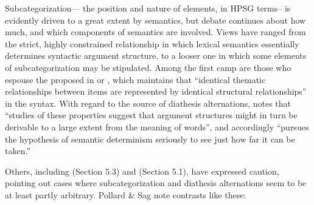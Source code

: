 \documentclass[output=paper
                ,modfonts
                ,nonflat
	        ,collection
	        ,collectionchapter
	        ,collectiontoclongg
 	        ,biblatex
                ,babelshorthands
                ,newtxmath
                ,draftmode
                ,colorlinks, citecolor=brown
]{./langsci/langscibook}
\begin{document}
Subcategorization--- the position and nature of \argst elements, in HPSG terms-- is evidently driven to a great extent by semantics,
but debate continues about how much, and which components of semantics are involved.
Views have ranged from the strict, highly constrained relationship in which lexical semantics essentially determines syntactic argument structure, to a looser one in which some elements of subcategorization may be stipulated.
Among  the first camp are those who espouse the   proposed in \citet[46]{Baker1988} or \citet{Baker1997}, which maintains that ``identical thematic relationships between items are represented by identical structural relationships'' in the syntax.
With regard to the source of  diathesis alternations, \citet[12-13]{Levin1993} notes that ``studies of these properties suggest that argument structures might in turn be derivable to a large extent from the meaning of words'', and accordingly ``pursues the hypothesis of semantic determinism seriously to see just how far it can be taken.''

Others, including \citet{pollard+sag:1987} (Section 5.3) and \citet{Davis2001} (Section 5.1), have expressed caution, pointing out cases where subcategorization and diathesis alternations  seem to be at least partly arbitrary.
Pollard \& Sag note contrasts like these:
\end{document}

